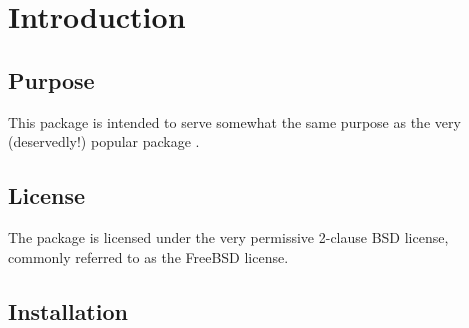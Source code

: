 \section{Introduction}


\subsection{Purpose}
This package is intended to serve somewhat the same purpose as the very 
(deservedly!) popular package .


\subsection{License}

The  package is licensed under the very permissive 2-clause BSD 
license, commonly referred to as the FreeBSD license.


\subsection{Installation}

